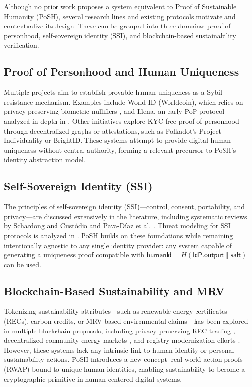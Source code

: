 \documentclass{article}
\begin{document}
Although no prior work proposes a system equivalent to Proof of Sustainable
Humanity (PoSH), several research lines and existing protocols motivate and
contextualize its design. These can be grouped into three domains:
proof-of-personhood, self-sovereign identity (SSI), and blockchain-based
sustainability verification.

\subsection{Proof of Personhood and Human Uniqueness}

Multiple projects aim to establish provable human uniqueness as a Sybil
resistance mechanism. Examples include World ID (Worldcoin), which relies on
privacy-preserving biometric nullifiers \cite{worldcoinWhitepaper}, and Idena,
an early PoP protocol analyzed in depth in \cite{ohlhaver2025compressed}. Other
initiatives explore KYC-free proof-of-personhood through decentralized graphs
or attestations, such as Polkadot's Project Individuality
\cite{polkadot2025individuality} or BrightID. These systems attempt to provide
digital human uniqueness without central authority, forming a relevant precursor
to PoSH's identity abstraction model.

\subsection{Self-Sovereign Identity (SSI)}

The principles of self-sovereign identity (SSI)---control, consent, portability,
and privacy---are discussed extensively in the literature, including systematic
reviews by Schardong and Custódio \cite{schardong2022ssiSurvey} and Pava-Díaz
et al. \cite{pava2024ssiBlockchain}. Threat modeling for SSI protocols is
analyzed in \cite{pohn2024ssiThreats}. PoSH builds on these foundations while
remaining intentionally agnostic to any single identity provider: any system
capable of generating a uniqueness proof compatible with
$\mathsf{humanId} = H(\textsf{IdP.output} \parallel \textsf{salt})$ can be used.

\subsection{Blockchain-Based Sustainability and MRV}

Tokenizing sustainability attributes---such as renewable energy certificates
(RECs), carbon credits, or MRV-based environmental claims---has been explored in
multiple blockchain proposals, including privacy-preserving REC trading
\cite{energy2024recTrading}, decentralized community energy markets
\cite{fu2023recCommunity}, and registry modernization efforts
\citet{infosys2025blockchainREC, heliyon2025indonesiaREC}. However, these systems
lack any intrinsic link to human identity or personal sustainability actions.
PoSH introduces a new concept: real-world action proofs (RWAP) bound to unique
human identities, enabling sustainability to become a cryptographic primitive
in human-centered digital systems.
\end{document}
